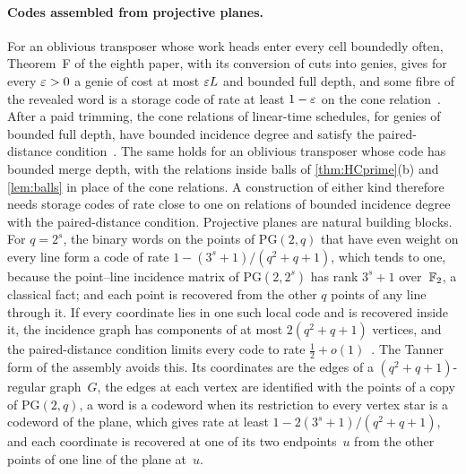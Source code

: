 \paragraph{Codes assembled from projective planes.}
For an oblivious transposer whose work heads enter every cell boundedly often, Theorem~F of the eighth paper, with its
conversion of cuts into genies, gives for every $\varepsilon>0$ a genie of cost at most $\varepsilon L$ and bounded full depth, and some
fibre of the revealed word is a storage code of rate at least $1-\varepsilon$ on the cone
relation~\cite[proofs of Corollaries~6.1 and~6.3]{BoundedNesting2026}. After a paid trimming, the cone relations of
linear-time schedules, for genies of bounded full depth, have bounded incidence degree and satisfy the paired-distance
condition~\cite[Definition~2.3, Theorem~3.3 and Corollary~3.8]{DirectedRecovery2026}. The same holds for an oblivious
transposer whose code has bounded merge depth, with the relations inside balls of \cref{thm:HCprime}(b) and
\cref{lem:balls} in place of the cone relations. A construction of either kind therefore needs storage codes of rate
close to one on relations of bounded incidence degree with the paired-distance condition. Projective planes are natural
building blocks. For $q=2^s$, the binary words on the points of $\mathrm{PG}(2,q)$ that have even weight on every line
form a code of rate $1-(3^s+1)/(q^2+q+1)$, which tends to one, because the point--line incidence matrix of
$\mathrm{PG}(2,2^s)$ has rank $3^s+1$ over~$\mathbb{F}_2$, a classical fact; and each point is recovered from the other $q$
points of any line through it. If every coordinate lies in one such local code and
is recovered inside it, the incidence graph has components of at most $2(q^2+q+1)$ vertices, and the paired-distance
condition limits every code to rate $\frac12+o(1)$~\cite[Theorem~4.2]{DirectedRecovery2026}. The Tanner form of the
assembly avoids this. Its coordinates are the edges of a $(q^2+q+1)$-regular graph~$G$, the edges at each vertex are
identified with the points of a copy of $\mathrm{PG}(2,q)$, a word is a codeword when its restriction to every vertex star
is a codeword of the plane, which gives rate at least $1-2(3^s+1)/(q^2+q+1)$, and each coordinate is recovered at one of
its two endpoints~$u$ from the other points of one line of the plane at~$u$.

